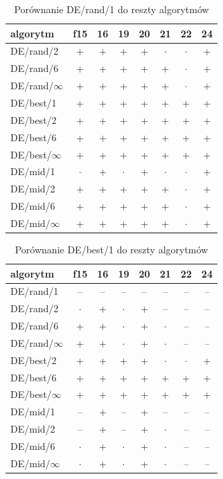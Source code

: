 \documentclass[a4paper,onecolumn,oneside,11pt,wide,floatssmall]{mwrep}
\theoremstyle{definition}
\theoremstyle{plain}%
\theoremstyle{remark}
\begin{document}
\begin{table}[H]
\centering
\begin{tabular}{ l | c | c | c | c | c | c | c }
algorytm         &f15& 16& 19& 20& 21& 22& 24 \\ \hline
DE/rand/2	 & + & + & + & + & $\cdot$ & $\cdot$ & + \\
DE/rand/6	 & + & + & + & + & + & $\cdot$ & + \\
DE/rand/$\infty$	 & + & + & + & + & + & $\cdot$ & + \\
DE/best/1	 & + & + & + & + & + & + & + \\
DE/best/2	 & + & + & + & + & + & + & + \\
DE/best/6	 & + & + & + & + & + & + & + \\
DE/best/$\infty$	 & + & + & + & + & + & + & + \\
DE/mid/1	 & $\cdot$ & + & $\cdot$ & + & $\cdot$ & $\cdot$ & + \\
DE/mid/2	 & + & + & + & + & + & $\cdot$ & + \\
DE/mid/6	 & + & + & + & + & + & $\cdot$ & + \\
DE/mid/$\infty$	 & + & + & + & + & + & $\cdot$ & + \\
\end{tabular}
\caption{Porównanie DE/rand/1 do reszty algorytmów}
\end{table}

\begin{table}[H]
\centering
\begin{tabular}{ l | c | c | c | c | c | c | c }
algorytm         &f15& 16& 19& 20& 21& 22& 24 \\ \hline
DE/rand/1	 & -- & -- & -- & -- & -- & -- & -- \\
DE/rand/2	 & $\cdot$ & + & $\cdot$ & + & -- & -- & -- \\
DE/rand/6	 & + & + & $\cdot$ & + & $\cdot$ & -- & -- \\
DE/rand/$\infty$	 & + & + & $\cdot$ & + & $\cdot$ & -- & -- \\
DE/best/2	 & + & + & + & + & $\cdot$ & $\cdot$ & + \\
DE/best/6	 & + & + & + & + & + & + & + \\
DE/best/$\infty$	 & + & + & + & + & + & + & + \\
DE/mid/1	 & -- & + & -- & + & -- & -- & -- \\
DE/mid/2	 & -- & + & -- & + & $\cdot$ & -- & -- \\
DE/mid/6	 & $\cdot$ & + & $\cdot$ & + & $\cdot$ & -- & -- \\
DE/mid/$\infty$	 & $\cdot$ & + & $\cdot$ & + & $\cdot$ & -- & -- \\
\end{tabular}
\caption{Porównanie DE/best/1 do reszty algorytmów}
\end{table}
\end{document}
